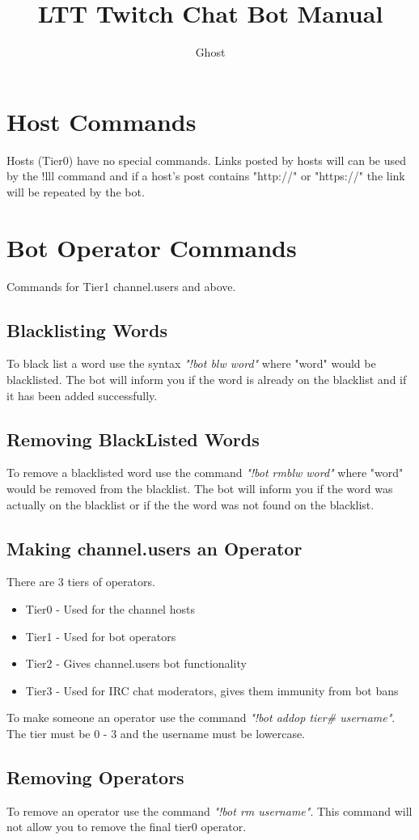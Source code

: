 \documentclass[10pt]{article}
\author{Ghost}
\title{LTT Twitch Chat Bot Manual}
\begin{document}
\maketitle
\tableofcontents
\section{Host Commands}
Hosts (Tier0) have no special commands. Links posted by hosts will can be used by the !lll command and if a host's post contains "http://" or "https://" the link will be repeated by the bot. 
\section{Bot Operator Commands}
Commands for Tier1 channel.users and above.
\subsection{Blacklisting Words}
To black list a word use the syntax \emph{"!bot blw word"} where "word" would be blacklisted. The bot will inform you if the word is already on the blacklist and if it has been added successfully.
\subsection{Removing BlackListed Words}
To remove a blacklisted word use the command \emph{"!bot rmblw word"} where "word" would be removed from the blacklist. The bot will inform you if the word was actually on the blacklist or if the the word was not found on the blacklist.
\subsection{Making channel.users an Operator}
There are 3 tiers of operators.
\begin{itemize}
\item {Tier0 - Used for the channel hosts}
\item {Tier1 - Used for bot operators}
\item {Tier2 - Gives channel.users bot functionality}
\item {Tier3 - Used for IRC chat moderators, gives them immunity from bot bans}
\end{itemize}
To make someone an operator use the command \emph{"!bot addop tier\# username"}. The tier must be 0 - 3 and the username must be lowercase.
\subsection{Removing Operators}
To remove an operator use the command \emph{"!bot rm username"}. This command will not allow you to remove the final tier0 operator.
\end{document}
